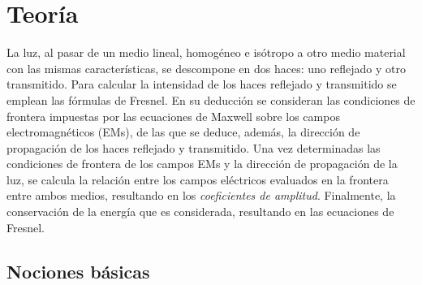\chapter{Teoría}

La luz, al pasar de un medio lineal, homogéneo e isótropo a otro medio material con las mismas características, se descompone en dos haces: uno reflejado y otro transmitido. Para calcular la intensidad de los haces reflejado y transmitido se emplean las fórmulas de Fresnel. En su deducción se consideran las condiciones de frontera impuestas por las ecuaciones de Maxwell sobre los campos electromagnéticos (EMs), de las que se deduce, además, la dirección de propagación de los haces reflejado y transmitido.  Una vez determinadas las condiciones de frontera de los campos EMs y la dirección de propagación de la luz, se calcula la relación  entre los campos eléctricos evaluados en la frontera entre ambos medios, resultando en los \emph{coeficientes de amplitud}. Finalmente, la conservación de la energía que es considerada, resultando en las ecuaciones de Fresnel.


\section{Nociones básicas}

